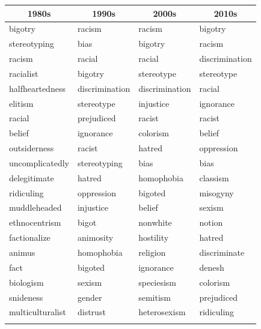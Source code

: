 \documentclass[output=paper]{langsci/langscibook}
\begin{document}
\begin{table}
\begin{tabular}{llll}
\multicolumn{1}{c}{1980s} & \multicolumn{1}{c}{1990s}  & \multicolumn{1}{c}{2000s} & \multicolumn{1}{c}{2010s}\\\midrule
bigotry&racism&racism&bigotry\\
stereotyping&bias&bigotry&racism\\
racism&racial&racial&discrimination\\
racialist&bigotry&stereotype&stereotype\\
halfheartedness&discrimination&discrimination&racial\\
elitism&stereotype&injustice&ignorance\\
racial&prejudiced&racist&racist\\
belief&ignorance&colorism&belief\\
outsiderness&racist&hatred&oppression\\
uncomplicatedly&stereotyping&bias&bias\\
delegitimate&hatred&homophobia&classism\\
ridiculing&oppression&bigoted&misogyny\\
muddleheaded&injustice&belief&sexism\\
ethnocentrism&bigot&nonwhite&notion\\
factionalize&animosity&hostility&hatred\\
animus&homophobia&religion&discriminate\\
fact&bigoted&ignorance&denesh\\
biologism&sexism&speciesism&colorism\\
snideness&gender&semitism&prejudiced\\
multiculturalist&distrust&heterosexism&ridiculing\\
\lspbottomrule
\end{tabular}
\end{table}
\end{document}
